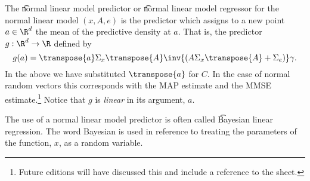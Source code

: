 The \t{normal linear model predictor} or \t{normal linear model regressor} for the normal linear model $(x, A, e)$ is the predictor which assigns to a new point $a \in \R ^d$ the mean of the predictive density at $a$.
That is, the predictor $g: \R ^d \to \R $ defined by
    \[
g(a) = \transpose{a}\Sigma _{x}\transpose{A}\inv{(A\Sigma _{x}\transpose{A} + \Sigma _e)}\gamma .
    \]
In the above we have substituted $\transpose{a}$ for $C$.
In the case of normal random vectors this corresponds with the MAP estimate and the MMSE estimate.\footnote{Future editions will have discussed this and include a reference to the sheet.}
Notice that $g$ is \textit{linear} in its argument, $a$.

The use of a normal linear model predictor is often called \t{Bayesian linear regression}.
The word Bayesian is used in reference to treating the parameters of the function, $x$, as a random variable.
